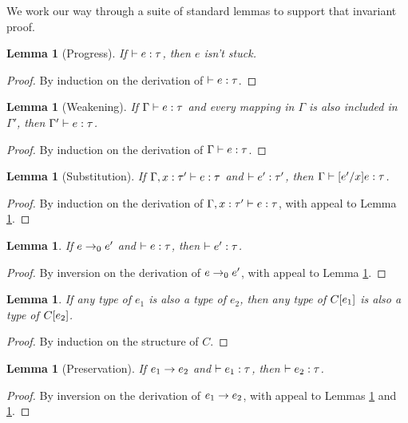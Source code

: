 \documentclass{amsbook}
\newtheorem{lemma}[theorem]{Lemma}
\theoremstyle{definition}
\theoremstyle{remark}
\numberwithin{section}{chapter}
\numberwithin{equation}{chapter}
\begin{document}
We work our way through a suite of standard lemmas to support that invariant proof.

\begin{lemma}[Progress]\label{progress}
  If $\hasty{}{e}{\tau}$, then $e$ isn't stuck.
\end{lemma}
\begin{proof}
  By induction on the derivation of $\hasty{}{e}{\tau}$.
\end{proof}

\begin{lemma}[Weakening]\label{weakening}
  If $\hasty{\Gamma}{e}{\tau}$ and every mapping in $\Gamma$ is also included in $\Gamma'$, then $\hasty{\Gamma'}{e}{\tau}$.
\end{lemma}
\begin{proof}
  By induction on the derivation of $\hasty{\Gamma}{e}{\tau}$.
\end{proof}

\begin{lemma}[Substitution]\label{substitution}
  If $\hasty{\Gamma, x : \tau'}{e}{\tau}$ and $\hasty{}{e'}{\tau'}$, then $\hasty{\Gamma}{\subst{e}{x}{e'}}{\tau}$.
\end{lemma}
\begin{proof}
  By induction on the derivation of $\hasty{\Gamma, x: \tau'}{e}{\tau}$, with appeal to Lemma \ref{weakening}.
\end{proof}

\begin{lemma}\label{preservation0}
  If $\smallstepo{e}{e'}$ and $\hasty{}{e}{\tau}$, then $\hasty{}{e'}{\tau}$.
\end{lemma}
\begin{proof}
  By inversion on the derivation of $\smallstepo{e}{e'}$, with appeal to Lemma \ref{substitution}.
\end{proof}

\begin{lemma}\label{generalize_plug}
  If any type of $e_1$ is also a type of $e_2$, then any type of $\plug{C}{e_1}$ is also a type of $\plug{C}{e_2}$.
\end{lemma}
\begin{proof}
  By induction on the structure of $C$.
\end{proof}

\begin{lemma}[Preservation]\label{preservation}
  If $\smallstep{e_1}{e_2}$ and $\hasty{}{e_1}{\tau}$, then $\hasty{}{e_2}{\tau}$.
\end{lemma}
\begin{proof}
  By inversion on the derivation of $\smallstep{e_1}{e_2}$, with appeal to Lemmas \ref{preservation0} and \ref{generalize_plug}.
\end{proof}
\end{document}
